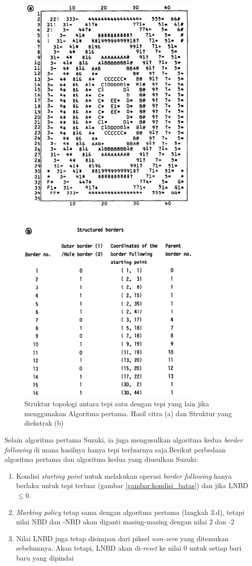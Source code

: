 \begin{figure}[H]
	\centering
	\includegraphics[keepaspectratio, width=9cm]{gambar/BorderFollowingPustaka/pic4.png}
	\caption{Struktur topologi antara tepi satu 
	dengan tepi yang lain jika menggunakan Algoritma 
	pertama. Hasil citra (a) dan Struktur yang diekstrak (b)}
	\label{gambar:Analisis_struktur_topologi}
\end{figure}

Selain algoritma pertama Suzuki, ia juga mengusulkan algoritma
kedua \textit{border following} di mana hasilnya hanya tepi 
terluarnya saja.Berikut perbedaan algoritma pertama dan 
algoritma kedua yang diusulkan Suzuki:
\begin{enumerate}
	\item Kondisi \textit{starting point} untuk melakukan
	operasi \textit{border following} hanya berlaku
	untuk tepi terluar (gambar \ref{gambar:kondisi_batas}) 
	dan jika LNBD $\leq 0$.
	\item \textit{Marking policy} tetap sama dengan algoritma
	pertama (langkah 3.d), tetapi nilai NBD dan -NBD akan
	diganti masing-masing dengan nilai 2 dan -2
	\item Nilai LNBD juga tetap disimpan dari piksel 
	\textit{non-zero} yang ditemukan sebelumnya. Akan
	tetapi, LNBD akan di-\textit{reset} ke nilai 0
	untuk setiap bari baru yang dipindai
\end{enumerate}

